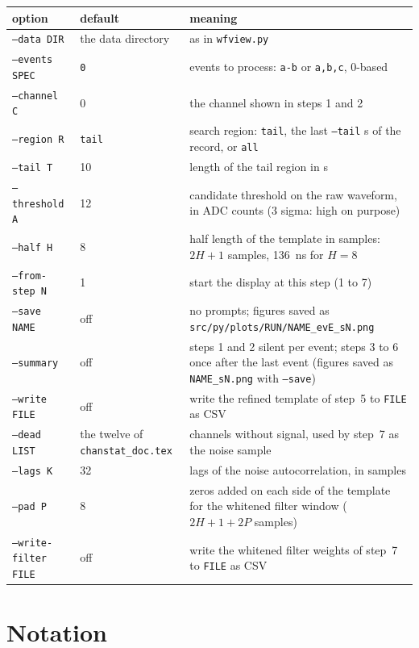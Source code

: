 \documentclass[11pt]{article}
\newcommand{\code}[1]{\texttt{#1}}
\newcommand{\us}{\textmu s}
\begin{document}
\begin{center}
\begin{tabular}{l l p{74mm}}
\toprule
option & default & meaning \\
\midrule
\code{--data DIR} & the data directory & as in \code{wfview.py} \\
\code{--events SPEC} & \code{0} & events to process: \code{a-b} or \code{a,b,c}, 0-based \\
\code{--channel C} & 0 & the channel shown in steps 1 and 2 \\
\code{--region R} & \code{tail} & search region: \code{tail}, the last \code{--tail} \us{} of the record, or \code{all} \\
\code{--tail T} & 10 & length of the tail region in \us \\
\code{--threshold A} & 12 & candidate threshold on the raw waveform, in ADC counts (3 sigma: high on purpose) \\
\code{--half H} & 8 & half length of the template in samples: $2H + 1$ samples, 136~ns for $H = 8$ \\
\code{--from-step N} & 1 & start the display at this step (1 to 7) \\
\code{--save NAME} & off & no prompts; figures saved as \code{src/py/plots/RUN/NAME\_evE\_sN.png} \\
\code{--summary} & off & steps 1 and 2 silent per event; steps 3 to 6 once after the last event (figures saved as \code{NAME\_sN.png} with \code{--save}) \\
\code{--write FILE} & off & write the refined template of step~5 to \code{FILE} as CSV \\
\code{--dead LIST} & the twelve of \code{chanstat\_doc.tex} & channels without signal, used by step~7 as the noise sample \\
\code{--lags K} & 32 & lags of the noise autocorrelation, in samples \\
\code{--pad P} & 8 & zeros added on each side of the template for the whitened filter window ($2H + 1 + 2P$ samples) \\
\code{--write-filter FILE} & off & write the whitened filter weights of step~7 to \code{FILE} as CSV \\
\bottomrule
\end{tabular}
\end{center}

\section{Notation}
\end{document}
